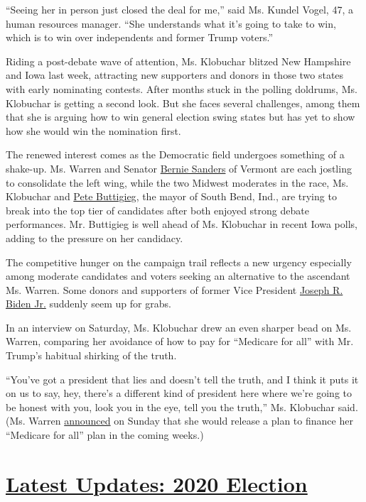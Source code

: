 ``Seeing her in person just closed the deal for me,'' said Ms. Kundel
Vogel, 47, a human resources manager. ``She understands what it's going
to take to win, which is to win over independents and former Trump
voters.''

Riding a post-debate wave of attention, Ms. Klobuchar blitzed New
Hampshire and Iowa last week, attracting new supporters and donors in
those two states with early nominating contests. After months stuck in
the polling doldrums, Ms. Klobuchar is getting a second look. But she
faces several challenges, among them that she is arguing how to win
general election swing states but has yet to show how she would win the
nomination first.

The renewed interest comes as the Democratic field undergoes something
of a shake-up. Ms. Warren and Senator
\href{https://www.nytimes.com/interactive/2020/us/elections/bernie-sanders.html}{Bernie
Sanders} of Vermont are each jostling to consolidate the left wing,
while the two Midwest moderates in the race, Ms. Klobuchar and
\href{https://www.nytimes.com/interactive/2020/us/elections/pete-buttigieg.html}{Pete
Buttigieg}, the mayor of South Bend, Ind., are trying to break into the
top tier of candidates after both enjoyed strong debate performances.
Mr. Buttigieg is well ahead of Ms. Klobuchar in recent Iowa polls,
adding to the pressure on her candidacy.

The competitive hunger on the campaign trail reflects a new urgency
especially among moderate candidates and voters seeking an alternative
to the ascendant Ms. Warren. Some donors and supporters of former Vice
President
\href{https://www.nytimes.com/interactive/2020/us/elections/joe-biden.html}{Joseph
R. Biden Jr.} suddenly seem up for grabs.

In an interview on Saturday, Ms. Klobuchar drew an even sharper bead on
Ms. Warren, comparing her avoidance of how to pay for ``Medicare for
all'' with Mr. Trump's habitual shirking of the truth.

``You've got a president that lies and doesn't tell the truth, and I
think it puts it on us to say, hey, there's a different kind of
president here where we're going to be honest with you, look you in the
eye, tell you the truth,'' Ms. Klobuchar said. (Ms. Warren
\href{https://www.nytimes.com/2019/10/20/us/politics/elizabeth-warren-medicare-for-all.html}{announced}
on Sunday that she would release a plan to finance her ``Medicare for
all'' plan in the coming weeks.)

\hypertarget{latest-updates-2020-election}{%
\section{\texorpdfstring{\href{https://www.nytimes.com/2020/07/31/us/elections/biden-vs-trump.html?action=click\&pgtype=Article\&state=default\&region=MAIN_CONTENT_1\&context=storylines_live_updates}{Latest
Updates: 2020
Election}}{Latest Updates: 2020 Election}}\label{latest-updates-2020-election}}

